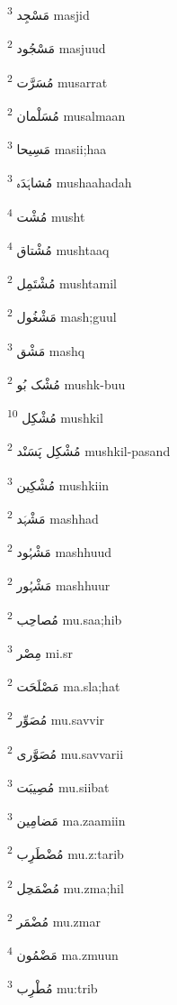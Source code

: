 \documentclass[12pt]{article}
\begin{document}
\begin{RTL}
\begin{multicols}{5}
{\ur مَسْجِد}   \textsuperscript{3} masjid

{\ur مَسْجُود}   \textsuperscript{2} masjuud

{\ur مُسَرَّت}   \textsuperscript{2} musarrat

{\ur مُسَلْمان}   \textsuperscript{2} musalmaan

{\ur مَسِیحا}   \textsuperscript{3} masii;haa

{\ur مُشاہَدَہ}   \textsuperscript{3} mushaahadah

{\ur مُشْت}   \textsuperscript{4} musht

{\ur مُشْتاق}   \textsuperscript{4} mushtaaq

{\ur مُشْتَمِل}   \textsuperscript{2} mushtamil

{\ur مَشْغُول}   \textsuperscript{2} mash;guul

{\ur مَشْق}   \textsuperscript{3} mashq

{\ur مُشْک بُو}   \textsuperscript{2} mushk-buu

{\ur مُشْکِل}   \textsuperscript{10} mushkil

{\ur مُشْکِل پَسَنْد}   \textsuperscript{2} mushkil-pasand

{\ur مُشْکِین}   \textsuperscript{3} mushkiin

{\ur مَشْہَد}   \textsuperscript{2} mashhad

{\ur مَشْہُود}   \textsuperscript{2} mashhuud

{\ur مَشْہُور}   \textsuperscript{2} mashhuur

{\ur مُصاحِب}   \textsuperscript{2} mu.saa;hib

{\ur مِصْر}   \textsuperscript{3} mi.sr

{\ur مَصْلَحَت}   \textsuperscript{2} ma.sla;hat

{\ur مُصَوِّر}   \textsuperscript{2} mu.savvir

{\ur مُصَوَّری}   \textsuperscript{2} mu.savvarii

{\ur مُصِیبَت}   \textsuperscript{3} mu.siibat

{\ur مَضامِین}   \textsuperscript{3} ma.zaamiin

{\ur مُضْطَرِب}   \textsuperscript{2} mu.z:tarib

{\ur مُضْمَحِل}   \textsuperscript{2} mu.zma;hil

{\ur مُضْمَر}   \textsuperscript{2} mu.zmar

{\ur مَضْمُون}   \textsuperscript{4} ma.zmuun

{\ur مُطْرِب}   \textsuperscript{3} mu:trib


\end{multicols}
\end{RTL}
\end{document}
